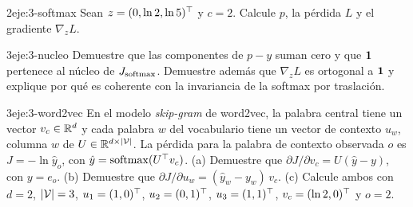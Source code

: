\begin{ejercicio}{2}{eje:3-softmax}
Sean $z=(0,\ln 2,\ln 5)^{\top}$ y $c=2$. Calcule $p$, la pérdida $L$ y el gradiente $\nabla_z L$.
\end{ejercicio}

\begin{ejercicio}{3}{eje:3-nucleo}
Demuestre que las componentes de $p-y$ suman cero y que $\mathbf{1}$ pertenece al núcleo de $J_{\operatorname{softmax}}$. Demuestre además que $\nabla_z L$ es ortogonal a $\mathbf{1}$ y explique por qué es coherente con la invariancia de la softmax por traslación.
\end{ejercicio}

\begin{ejercicio}{3}{eje:3-word2vec}
En el modelo \emph{skip-gram} de word2vec, la palabra central tiene un vector $v_c\in\mathbb{R}^{d}$ y cada palabra $w$ del vocabulario tiene un vector de contexto $u_w$, columna $w$ de $U\in\mathbb{R}^{d\times\lvert\mathcal{V}\rvert}$. La pérdida para la palabra de contexto observada $o$ es $J=-\ln\hat y_o$, con $\hat y=\operatorname{softmax}(U^{\top} v_c)$. (a) Demuestre que $\partial J/\partial v_c=U(\hat y-y)$, con $y=e_o$. (b) Demuestre que $\partial J/\partial u_w=(\hat y_w-y_w)\,v_c$. (c) Calcule ambos con $d=2$, $\lvert\mathcal{V}\rvert=3$, $u_1=(1,0)^{\top}$, $u_2=(0,1)^{\top}$, $u_3=(1,1)^{\top}$, $v_c=(\ln 2,0)^{\top}$ y $o=2$.
\end{ejercicio}

